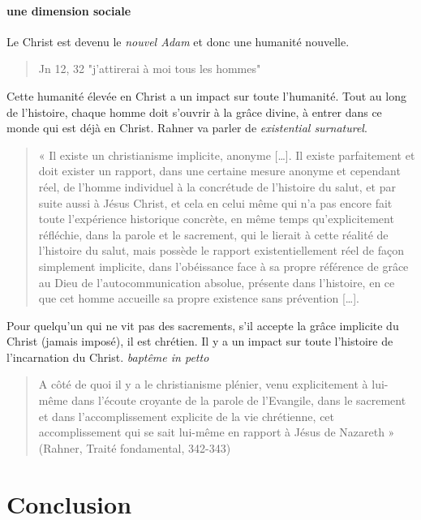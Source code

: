 \paragraph{une dimension sociale} Le Christ est devenu le \textit{nouvel Adam} et donc une humanité nouvelle. 
\begin{quote}
    Jn 12, 32 "j'attirerai à moi tous les hommes"
\end{quote}
Cette humanité élevée en Christ a un impact sur toute l'humanité. Tout au long de l'histoire, chaque homme doit s'ouvrir à la grâce divine, à entrer dans ce monde qui est déjà en Christ. Rahner va parler de \textit{existential surnaturel}.

\begin{quote}
    « Il existe un christianisme implicite, anonyme […]. Il existe parfaitement et doit exister un rapport, dans une certaine mesure anonyme et cependant réel, de l’homme individuel à la concrétude de l’histoire du salut, et par suite aussi à Jésus Christ, et cela en celui même qui n’a pas encore fait toute l’expérience historique concrète, en même temps qu’explicitement réfléchie, dans la parole et le sacrement, qui le lierait à cette réalité de l’histoire du salut, mais  possède le rapport existentiellement réel de façon simplement implicite, dans l’obéissance face à sa propre référence de grâce au Dieu de l’autocommunication absolue, présente dans l’histoire, en ce que cet homme accueille sa propre existence sans prévention […]. 
    \end{quote}
Pour quelqu'un qui ne vit pas des sacrements, s'il accepte la grâce implicite du Christ (jamais imposé), il est chrétien. Il y a un impact sur toute l'histoire de l'incarnation du Christ. \textit{baptême in petto}


\begin{quote}
A côté de quoi il y a le christianisme plénier, venu explicitement à lui-même dans l’écoute croyante de la parole de l’Evangile, dans le sacrement et dans l’accomplissement explicite de la vie chrétienne, cet accomplissement qui se sait lui-même en rapport à Jésus de Nazareth » (Rahner, Traité fondamental, 342-343) 
\end{quote}



\section{Conclusion}  

